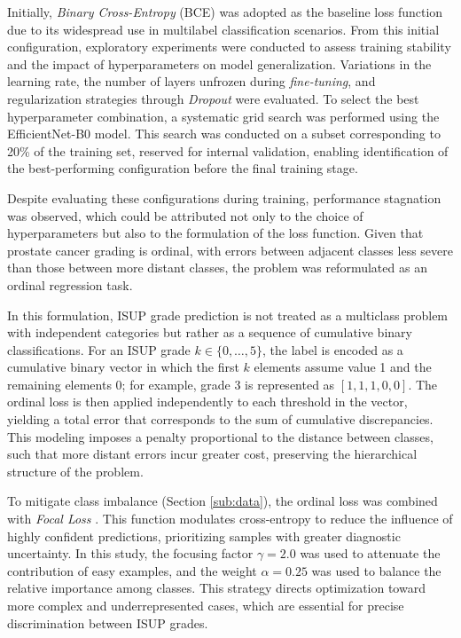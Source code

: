 Initially, \textit{Binary Cross-Entropy} (BCE) was adopted as the baseline loss function due to its widespread use in multilabel classification scenarios. From this initial configuration, exploratory experiments were conducted to assess training stability and the impact of hyperparameters on model generalization. Variations in the learning rate, the number of layers unfrozen during \textit{fine-tuning}, and regularization strategies through \textit{Dropout} were evaluated. To select the best hyperparameter combination, a systematic grid search was performed using the EfficientNet-B0 model. This search was conducted on a subset corresponding to 20\% of the training set, reserved for internal validation, enabling identification of the best-performing configuration before the final training stage.

Despite evaluating these configurations during training, performance stagnation was observed, which could be attributed not only to the choice of hyperparameters but also to the formulation of the loss function. Given that prostate cancer grading is ordinal, with errors between adjacent classes less severe than those between more distant classes, the problem was reformulated as an ordinal regression task.

In this formulation, ISUP grade prediction is not treated as a multiclass problem with independent categories but rather as a sequence of cumulative binary classifications. For an ISUP grade $k \in \{0,\dots,5\}$, the label is encoded as a cumulative binary vector in which the first $k$ elements assume value 1 and the remaining elements 0; for example, grade 3 is represented as $[1,1,1,0,0]$. The ordinal loss is then applied independently to each threshold in the vector, yielding a total error that corresponds to the sum of cumulative discrepancies. This modeling imposes a penalty proportional to the distance between classes, such that more distant errors incur greater cost, preserving the hierarchical structure of the problem.

To mitigate class imbalance (Section \ref{sub:data}), the ordinal loss was combined with \textit{Focal Loss} \cite{lin2017focal, DINA2023100699, CHEN2026235}. This function modulates cross-entropy to reduce the influence of highly confident predictions, prioritizing samples with greater diagnostic uncertainty. In this study, the focusing factor $\gamma = 2.0$ was used to attenuate the contribution of easy examples, and the weight $\alpha = 0.25$ was used to balance the relative importance among classes. This strategy directs optimization toward more complex and underrepresented cases, which are essential for precise discrimination between ISUP grades.

